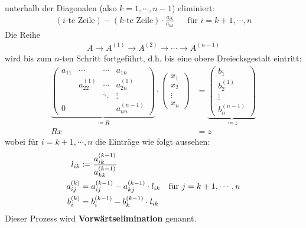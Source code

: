 \documentclass[ngerman,fontsize=11pt, paper=a4, parskip=half, titlepage=true, toc=bib]{scrbook}
\theoremstyle{definition}
\theoremstyle{plain}
\begin{document}
unterhalb der Diagonalen (also $k=1, \cdots, n-1$) eliminiert:
\begin{align*}
  (\text{$i$-te Zeile})- (\text{$k$-te Zeile})\cdot\frac{a_{ik}}{a_{kk}}
  && \text{für } i=k+1, \cdots ,n 
\end{align*}
Die Reihe 
\begin{gather*}
  A \rightarrow A^{(1)} \rightarrow A^{(2)} \rightarrow \dotsm \rightarrow A^{(n-1)}
\end{gather*}
wird bis zum $n$-ten Schritt fortgeführt, d.h. bis eine obere Dreiecksgestalt eintritt:
\begin{align}
  \nonumber
  \underbrace{	\begin{pmatrix}
      a_{11} & \dotsm & \dotsm & a_{1n} \\
      & a_{22}^{(1)} & \dotsm & a_{2n}^{(1)} \\
      &&              \ddots  &  \vdots \\
      0        && &                             a_{nn}^{(n-1)}
    \end{pmatrix}}_{\coloneqq R}
                    \cdot
                    \begin{pmatrix}
                      x_1 \\
                      x_2 \\
                      \vdots \\
                      x_n
                    \end{pmatrix}
             & =
               \underbrace{\begin{pmatrix}
                   b_1 \\
                   b_2^{(1)} \\
                   \vdots \\
                   b_n^{(n-1)}
                 \end{pmatrix}}_{\coloneqq z} \\
  Rx &= z 	\label{II.1.1} 
\end{align}
wobei für  $i=k+1, \cdots ,n$ die Einträge wie folgt aussehen:
\begin{align}	
  l_{ik} &\coloneqq \frac{a_{ik}^{(k-1)}}{a_{kk}^{(k-1)}} \label{II.1.2} \\
  a_{ij}^{(k)} &= a_{ij}^{(k-1)} - a_{kj}^{(k-1)}\cdot l_{ik} \label{II.1.3}
               & \text{für } j=k+1, \cdots , n\\ %
  b_i^{(k)} &= b_i^{(k-1)} -b_k^{(k-1)} \cdot   l_{ik}
  \label{II.1.4}\index{Vorwärtssubstitution}
\end{align}
Dieser Prozess wird \textbf{Vorwärtselimination} genannt.\\
\end{document}
